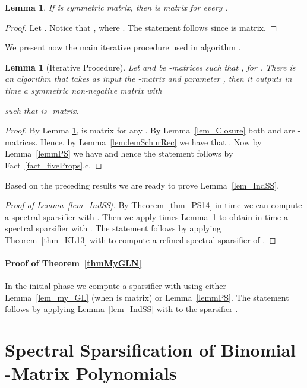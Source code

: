 \documentclass[11pt]{article}
\newcommand{\lemref}[1]{Lemma~\ref{lem:#1}}
\newtheorem{lem}[thm]{Lemma}
\numberwithin{thm}{section}
\begin{document}
\begin{lem}\label{lem_DM_2k}
If  is symmetric matrix, then 
is  matrix for every .
\end{lem}

\begin{proof}
Let . Notice that ,
where . The statement follows since 
is  matrix.
\end{proof}

We present now the main iterative procedure used in algorithm .

\begin{lem}[Iterative Procedure]\label{lem_SqrSSREC}
Let  and  be -matrices such that , for . There is an algorithm 
that takes as input the -matrix 
and parameter , then it outputs in 
time a symmetric non-negative matrix  with

such that  is -matrix.
\end{lem}

\begin{proof}
By Lemma \ref{lem_DM_2k},  is 
matrix for any . By Lemma~\ref{lem_Closure} both  and 
are -matrices. Hence, by \lemref{lemSchurRec}
we have that . Now by Lemma~\ref{lemmPS} we have  and hence the statement follows by Fact~\ref{fact_fiveProps}.c.
\end{proof}

Based on the preceding results we are ready to prove Lemma~\ref{lem_IndSS}.

\begin{proof}[Proof of Lemma~\ref{lem_IndSS}]
By Theorem~\ref{thm_PS14} in time  we can compute a spectral sparsifier  with . Then we apply  times Lemma~\ref{lem_SqrSSREC} to obtain in  time a spectral sparsifier  with . The statement follows by applying Theorem~\ref{thm_KL13} with  to compute a refined spectral sparsifier of .
\end{proof}


\paragraph*{Proof of Theorem~\ref{thmMyGLN}}
In the initial phase we compute a sparsifier  with  using either Lemma~\ref{lem_my_GL} (when  is  matrix) or Lemma~\ref{lemmPS}. The statement follows by applying Lemma~\ref{lem_IndSS} with  to the sparsifier .



\section{Spectral Sparsification of Binomial -Matrix Polynomials}\label{sec:SSBGLPM}
\end{document}
